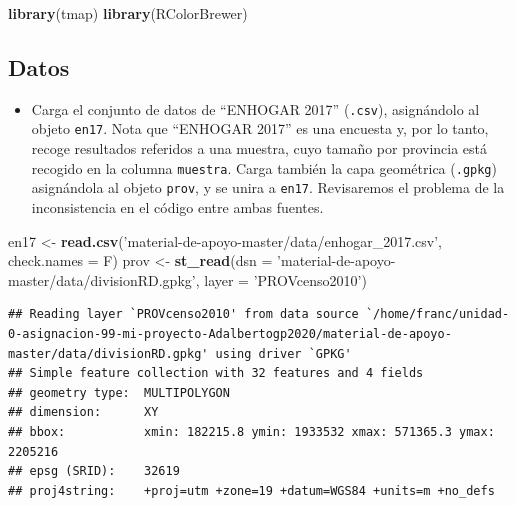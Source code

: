 \documentclass[11pt,]{article}
\newenvironment{Shaded}{\begin{snugshade}}{\end{snugshade}}
\newcommand{\KeywordTok}[1]{\textcolor[rgb]{0.13,0.29,0.53}{\textbf{#1}}}
\newcommand{\DataTypeTok}[1]{\textcolor[rgb]{0.13,0.29,0.53}{#1}}
\newcommand{\DecValTok}[1]{\textcolor[rgb]{0.00,0.00,0.81}{#1}}
\newcommand{\StringTok}[1]{\textcolor[rgb]{0.31,0.60,0.02}{#1}}
\newcommand{\OperatorTok}[1]{\textcolor[rgb]{0.81,0.36,0.00}{\textbf{#1}}}
\newcommand{\NormalTok}[1]{#1}
\providecommand{\tightlist}{%
\setlength{\itemsep}{0pt}\setlength{\parskip}{0pt}}
\begin{document}
\begin{Shaded}
\begin{Highlighting}[]
\KeywordTok{library}\NormalTok{(tmap)}
\KeywordTok{library}\NormalTok{(RColorBrewer)}
\end{Highlighting}
\end{Shaded}

\subsection{Datos}\label{datos}

\begin{itemize}
\tightlist
\item
  Carga el conjunto de datos de ``ENHOGAR 2017'' (\texttt{.csv}),
  asignándolo al objeto \texttt{en17}. Nota que ``ENHOGAR 2017'' es una
  encuesta y, por lo tanto, recoge resultados referidos a una muestra,
  cuyo tamaño por provincia está recogido en la columna
  \texttt{muestra}. Carga también la capa geométrica (\texttt{.gpkg})
  asignándola al objeto \texttt{prov}, y se unira a \texttt{en17}.
  Revisaremos el problema de la inconsistencia en el código entre ambas
  fuentes.
\end{itemize}

\begin{Shaded}
\begin{Highlighting}[]
\NormalTok{en17 <-}\StringTok{ }\KeywordTok{read.csv}\NormalTok{(}\StringTok{'material-de-apoyo-master/data/enhogar_2017.csv'}\NormalTok{, }\DataTypeTok{check.names =}\NormalTok{ F)}
\NormalTok{prov <-}\StringTok{ }\KeywordTok{st_read}\NormalTok{(}\DataTypeTok{dsn =} \StringTok{'material-de-apoyo-master/data/divisionRD.gpkg'}\NormalTok{, }\DataTypeTok{layer =} \StringTok{'PROVcenso2010'}\NormalTok{)}
\end{Highlighting}
\end{Shaded}

\begin{verbatim}
## Reading layer `PROVcenso2010' from data source `/home/franc/unidad-0-asignacion-99-mi-proyecto-Adalbertogp2020/material-de-apoyo-master/data/divisionRD.gpkg' using driver `GPKG'
## Simple feature collection with 32 features and 4 fields
## geometry type:  MULTIPOLYGON
## dimension:      XY
## bbox:           xmin: 182215.8 ymin: 1933532 xmax: 571365.3 ymax: 2205216
## epsg (SRID):    32619
## proj4string:    +proj=utm +zone=19 +datum=WGS84 +units=m +no_defs
\end{verbatim}

\begin{Shaded}
\end{Shaded}
\end{document}
